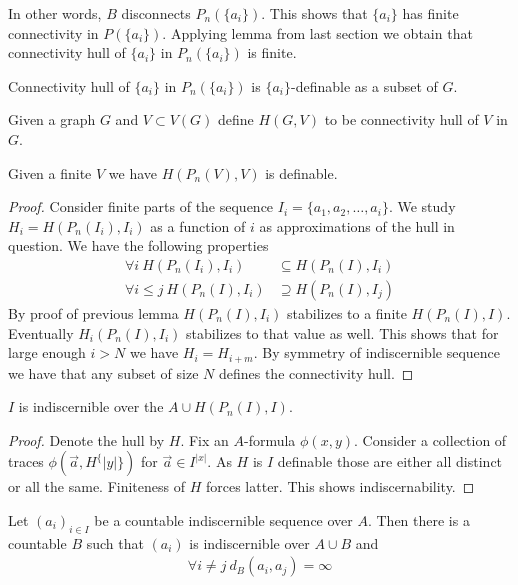 \documentclass{amsart}
\begin{document}
In other words, $B$ disconnects $P_n(\{a_i\})$. This shows that $\{a_i\}$ has finite connectivity in $P(\{a_i\})$. Applying lemma from last section we obtain that connectivity hull of $\{a_i\}$ in $P_n(\{a_i\})$ is finite.

\begin{Lemma}
	Connectivity hull of $\{a_i\}$ in $P_n(\{a_i\})$ is $\{a_i\}$-definable as a subset of $G$.
\end{Lemma}

\begin{Definition}
	Given a graph $G$ and $V \subset V(G)$ define $H(G, V)$ to be connectivity hull of $V$ in $G$.
\end{Definition}

\begin{Note}
	Given a finite $V$ we have $H(P_n(V), V)$ is definable.
\end{Note}

\begin{proof}
	Consider finite parts of the sequence $I_i = \{a_1, a_2, \ldots, a_i\}$. We study $H_i = H(P_n(I_i), I_i)$ as a function of $i$ as approximations of the hull in question. We have the following properties
	\begin{align*}
		 \forall i \ H(P_n(I_i), I_i) &\subseteq H(P_n(I), I_i) \\
		 \forall i \leq j \ H(P_n(I), I_i) &\supseteq H(P_n(I), I_j)
	\end{align*}
	By proof of previous lemma $H(P_n(I), I_i)$ stabilizes to a finite $H(P_n(I), I)$. Eventually $H_i(P_n(I), I_i)$ stabilizes to that value as well. This shows that for large enough $i>N$ we have $H_i = H_{i+m}$. By symmetry of indiscernible sequence we have that any subset of size $N$ defines the connectivity hull.
\end{proof}

\begin{Lemma}
	$I$ is indiscernible over the $A \cup H(P_n(I), I)$.
\end{Lemma}

\begin{proof}
	Denote the hull by $H$. Fix an $A$-formula $\phi(x,y)$. Consider a collection of traces $\phi(\vec a, H^\{|y|\})$ for $\vec a \in I^{|x|}$. As $H$ is $I$ definable those are either all distinct or all the same. Finiteness of $H$ forces latter. This shows indiscernability.
\end{proof}

\begin{Corollary}
	Let $(a_i)_{i \in I}$ be a countable indiscernible sequence over $A$. Then there is a countable $B$ such that  $(a_i)$ is indiscernible over $A \cup B$ and
	\begin{align*}
		\forall i \neq j \ d_B(a_i, a_j) = \infty
	\end{align*}
\end{Corollary}
\end{document}
